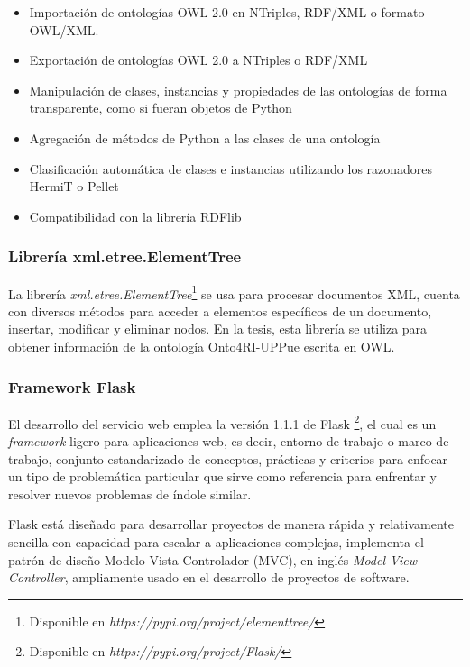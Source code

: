 \begin{itemize}
    \item Importaci\'on de ontolog\'ias OWL 2.0 en NTriples, RDF/XML o formato OWL/XML.
    \item Exportaci\'on de ontolog\'ias OWL 2.0 a NTriples o RDF/XML
    \item Manipulaci\'on de clases, instancias y propiedades de las ontolog\'ias de forma transparente, como si fueran objetos de Python
    \item Agregaci\'on de m\'etodos de Python a las clases de una ontolog\'ia
    \item Clasificaci\'on autom\'atica de clases e instancias utilizando los razonadores HermiT o Pellet 
    \item Compatibilidad con la librer\'ia RDFlib 
  \end{itemize}

\subsubsection{Librer\'ia xml.etree.ElementTree}

La librer\'ia \textit{xml.etree.ElementTree}\footnote{Disponible en \textit{https://pypi.org/project/elementtree/}} se usa para procesar documentos XML, cuenta con diversos m\'etodos para acceder a elementos espec\'ificos de un documento, insertar, modificar y eliminar nodos. En la tesis, esta librer\'ia se utiliza para obtener informaci\'on de la ontolog\'ia Onto4RI-UPPue escrita en OWL.

\subsubsection{Framework Flask}

El desarrollo del servicio web emplea la versi\'on 1.1.1 de Flask \footnote{Disponible en \emph{https://pypi.org/project/Flask/}}, el cual es un \emph{framework} ligero para aplicaciones web, es decir, entorno de trabajo o marco de trabajo, conjunto estandarizado de conceptos, pr\'acticas y criterios para enfocar un tipo de problem\'atica particular que sirve como referencia para enfrentar y resolver nuevos problemas de \'indole similar. 

Flask est\'a dise\~{n}ado para desarrollar proyectos de manera r\'apida y relativamente sencilla con capacidad para escalar a aplicaciones complejas, implementa el patr\'on de dise\~{n}o Modelo-Vista-Controlador (MVC), en ingl\'es \emph{Model-View-Controller}, ampliamente usado en el desarrollo de proyectos de software. 

